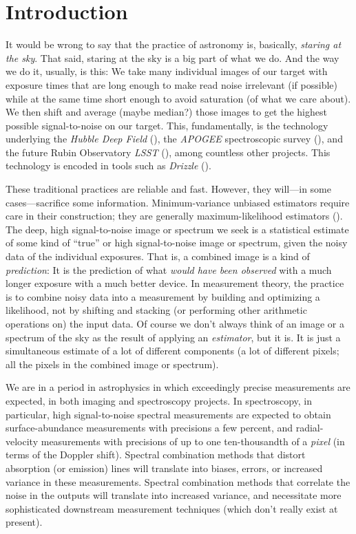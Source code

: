 \documentclass[modern]{aastex631}
\begin{document}
\section{Introduction}\label{sec:intro}

It would be wrong to say that the practice of astronomy is, basically, \emph{staring at the sky}.
That said, staring at the sky is a big part of what we do.
And the way we do it, usually, is this:
We take many individual images of our target with exposure times that are long enough to make read noise irrelevant (if possible) while at the same time short enough to avoid saturation (of what we care about).
We then shift and average (maybe median?) those images to get the highest possible signal-to-noise on our target.
This, fundamentally, is the technology underlying the \textsl{Hubble Deep Field} (\citealt{hdf}),
the \textsl{APOGEE} spectroscopic survey (\citealt{apogee}),
and the future Rubin Observatory \textsl{LSST} (\citealt{lsst}), among countless other projects.
This technology is encoded in tools such as \textsl{Drizzle} (\citealt{drizzle}).

These traditional practices are reliable and fast.
However, they will---in some cases---sacrifice some information.
Minimum-variance unbiased estimators require care in their construction; they are generally maximum-likelihood estimators (\citealt{mvue}). %
The deep, high signal-to-noise image or spectrum we seek is a statistical estimate of some kind of ``true'' or high signal-to-noise image or spectrum, given the noisy data of the individual exposures.
That is, a combined image is a kind of \emph{prediction}: It is the prediction of what \emph{would have been observed} with a much longer exposure with a much better device.
In measurement theory, the practice is to combine noisy data into a measurement by building and optimizing a likelihood, not by shifting and stacking (or performing other arithmetic operations on) the input data.
Of course we don't always think of an image or a spectrum of the sky as the result of applying an \emph{estimator}, but it is.
It is just a simultaneous estimate of a lot of different components (a lot of different pixels; all the pixels in the combined image or spectrum).

We are in a period in astrophysics in which exceedingly precise measurements are expected, in both imaging and spectroscopy projects.
In spectroscopy, in particular, high signal-to-noise spectral measurements are expected to obtain surface-abundance measurements with precisions a few percent, and radial-velocity measurements with precisions of up to one ten-thousandth of a \emph{pixel} (in terms of the Doppler shift).
Spectral combination methods that distort absorption (or emission) lines will translate into biases, errors, or increased variance in these measurements.
Spectral combination methods that correlate the noise in the outputs will translate into increased variance, and necessitate more sophisticated downstream measurement techniques (which don't really exist at present).
\end{document}
